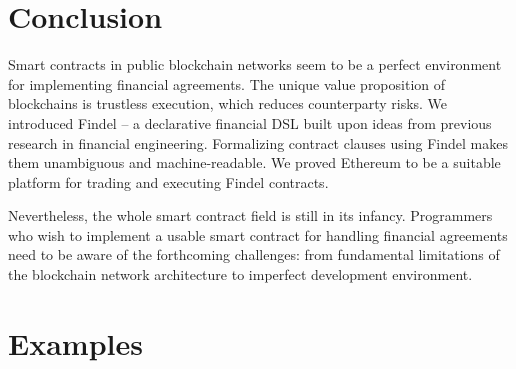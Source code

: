\section{Conclusion}

Smart contracts in public blockchain networks seem to be a perfect environment for implementing financial agreements.
The unique value proposition of blockchains is trustless execution, which reduces counterparty risks.
We introduced Findel -- a declarative financial DSL built upon ideas from previous research in financial engineering.
Formalizing contract clauses using Findel makes them unambiguous and machine-readable.
We proved Ethereum to be a suitable platform for trading and executing Findel contracts.

Nevertheless, the whole smart contract field is still in its infancy.
Programmers who wish to implement a usable smart contract for handling financial agreements need to be aware of the forthcoming challenges: from fundamental limitations of the blockchain network architecture to imperfect development environment.



\section{Examples} \label{sec:Ch10FindelExamples}

